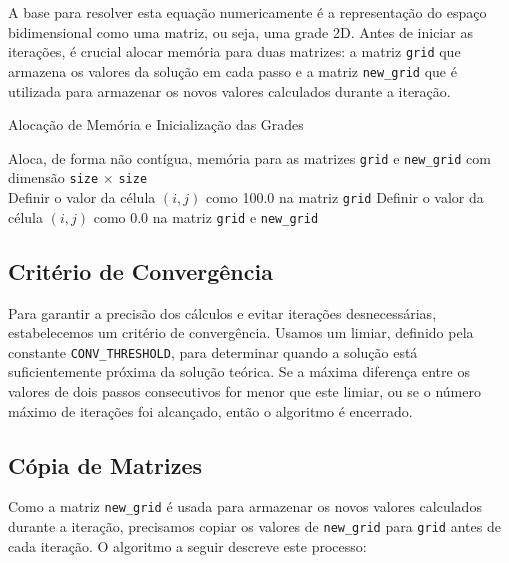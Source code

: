 \documentclass[conference]{IEEEtran}
\begin{document}
A base para resolver esta equação numericamente é a representação do espaço bidimensional como uma matriz, ou seja, uma grade 2D. Antes de iniciar as iterações, é crucial alocar memória para duas matrizes: a matriz \texttt{grid} que armazena os valores da solução em cada passo e a matriz \texttt{new\_grid} que é utilizada para armazenar os novos valores calculados durante a iteração.

\begin{algorithm}[H]
    \caption{Alocação de Memória e Inicialização das Grades}
    \begin{algorithmic}[1]
        \State Aloca, de forma não contígua, memória para as matrizes \texttt{grid} e \texttt{new\_grid} com dimensão \texttt{size} \(\times\) \texttt{size}
        \EndFunction
        \\
        \State Definir o valor da célula $(i, j)$ como 100.0 na matriz
        \texttt{grid}
        \Else
        \State Definir o valor da célula $(i, j)$ como 0.0 na matriz \texttt{grid} e \texttt{new\_grid}
        \EndIf
        \EndFor
        \EndFunction
    \end{algorithmic}
\end{algorithm}



\subsection{Critério de Convergência}

Para garantir a precisão dos cálculos e evitar iterações desnecessárias, estabelecemos um critério de convergência. Usamos um limiar, definido pela constante \texttt{CONV\_THRESHOLD}, para determinar quando a solução está suficientemente próxima da solução teórica. Se a máxima diferença entre os valores de dois passos consecutivos for menor que este limiar, ou se o número máximo de iterações foi alcançado, então o algoritmo é encerrado.


\subsection {Cópia de Matrizes}

Como a matriz \texttt{new\_grid} é usada para armazenar os novos valores calculados durante a iteração, precisamos copiar os valores de \texttt{new\_grid} para \texttt{grid} antes de cada iteração. O algoritmo a seguir descreve este processo:
\end{document}
